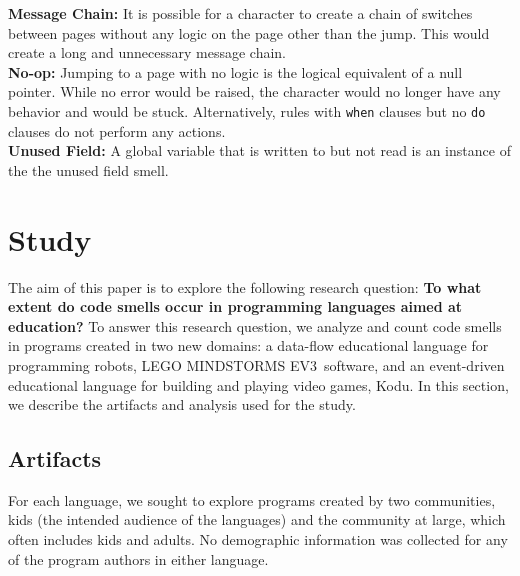 \documentclass[conference]{IEEEtran}
\newcommand{\ms}{LEGO MINDSTORMS EV3}
\begin{document}
\textbf{Message Chain:} It is possible for a character to create a chain of switches between pages without any logic on the page other than the jump. This would create a long and unnecessary message chain. \\
\textbf{No-op:} Jumping to a page with no logic is the logical equivalent of a null pointer. While no error would be raised, the character would no longer have any behavior and would be stuck. Alternatively, rules with {\tt when} clauses but no {\tt do} clauses do not perform any actions. \\
\textbf{Unused Field:} A global variable that is written to but not read is an instance of the the unused field smell. \\



\section{Study}
\label{sec:study}
The aim of this paper is to explore the following research question: \textbf{To what extent do code smells occur in programming languages aimed at education?} 
%
To answer this research question, we analyze and count code smells in programs created in two new domains: a data-flow educational language for programming robots, \ms~software,  and an event-driven educational language for building and playing video games, Kodu. 
In this section, we describe the artifacts and analysis used for the study. 

\subsection{Artifacts}
For each language, we sought to explore programs created by two communities, kids (the intended audience of the languages) and the community at large, which often includes kids and adults. No demographic information was collected for any of the program authors in either language. 
\end{document}
